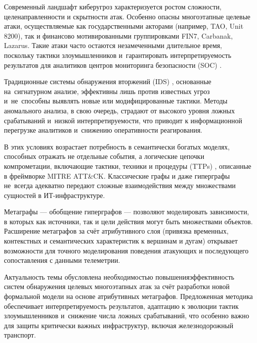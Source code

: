 {\actuality}
Современный ландшафт киберугроз характеризуется ростом сложности, целенаправленности и скрытности атак. Особенно опасны многоэтапные целевые атаки, осуществляемые как государственными акторами (например, TAO, Unit 8200), так и финансово мотивированными группировками FIN7, Carbanak, Lazarus. Такие атаки часто остаются незамеченными длительное время, поскольку тактики злоумышленников и~гарантировать интерпретируемость результатов для аналитиков центров мониторинга безопасности (SOC)
\ifsynopsis
\else
\fi.

Традиционные системы обнаружения вторжений (IDS)
\ifsynopsis
\else
\fi, основанные на~сигнатурном анализе, эффективны лишь против известных угроз и~не~способны выявлять новые или модифицированные тактики. Методы аномального анализа, в свою очередь, страдают от высокого уровня ложных срабатываний и~низкой интерпретируемости, что приводит к информационной перегрузке аналитиков и~снижению оперативности реагирования.

В этих условиях возрастает потребность в семантически богатых моделях, способных отражать не отдельные события, а логические цепочки компрометации, включающие тактики, техники и процедуры (TTPs)
\ifsynopsis
\else
\fi, описанные в фреймворке MITRE ATT\&CK. Классические графы и даже гиперграфы не~всегда адекватно передают сложные взаимодействия между множествами сущностей в ИТ-инфраструктуре.

Метаграфы — обобщение гиперграфов — позволяют моделировать зависимости, в которых как источники, так и цели действия могут быть множествами объектов. Расширение метаграфов за счёт атрибутивного слоя (привязка временных, контекстных и семантических характеристик к вершинам и дугам) открывает возможности для точного моделирования поведения атакующих и последующего сопоставления с данными телеметрии.

\ifsynopsis
Актуальность темы обусловлена необходимостью повышения\linebreak эффективность систем обнаружения целевых многоэтапных атак за счёт разработки новой формальной модели на основе атрибутивных метаграфов. Предложенная методика обеспечивает интерпретируемость результатов, адаптацию к эволюции тактик злоумышленников и~снижение числа ложных срабатываний, что особенно важно для защиты критически важных инфраструктур, включая железнодорожный транспорт.
\else


